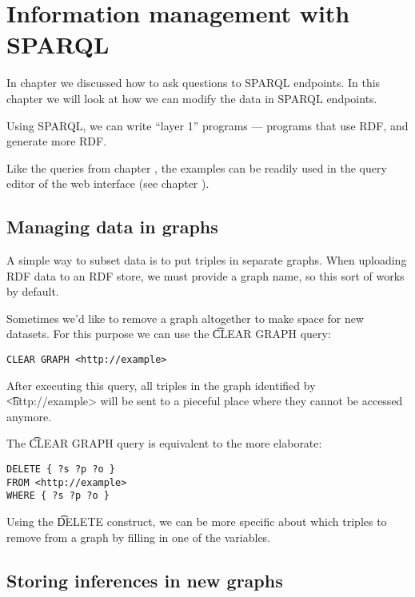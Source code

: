 \chapter{Information management with SPARQL}

  In chapter  we discussed how to ask
  questions to SPARQL endpoints.  In this chapter we will look at how we can
  modify the data in SPARQL endpoints.

  Using SPARQL, we can write ``layer 1'' programs --- programs that use RDF,
  and generate more RDF.

  Like the queries from chapter , the
  examples can be readily used in the query editor of the web interface (see
  chapter ).

\section{Managing data in graphs}

  A simple way to subset data is to put triples in separate graphs.  When
  uploading RDF data to an RDF store, we must provide a graph name, so this
  sort of works by default.

  Sometimes we'd like to remove a graph altogether to make space for new
  datasets.  For this purpose we can use the \t{CLEAR GRAPH} query:

\begin{lstlisting}[language=SPARQL]
CLEAR GRAPH <http://example>
\end{lstlisting}

  After executing this query, all triples in the graph identified by
  \t{<http://example>} will be sent to a pieceful place where they
  cannot be accessed anymore.

  The \t{CLEAR GRAPH} query is equivalent to the more elaborate:

\begin{lstlisting}[language=SPARQL]
DELETE { ?s ?p ?o }
FROM <http://example>
WHERE { ?s ?p ?o }
\end{lstlisting}

  Using the \t{DELETE} construct, we can be more specific about which
  triples to remove from a graph by filling in one of the variables.

\section{Storing inferences in new graphs}
\label{sec:storing-inferences-in-new-graphs}

